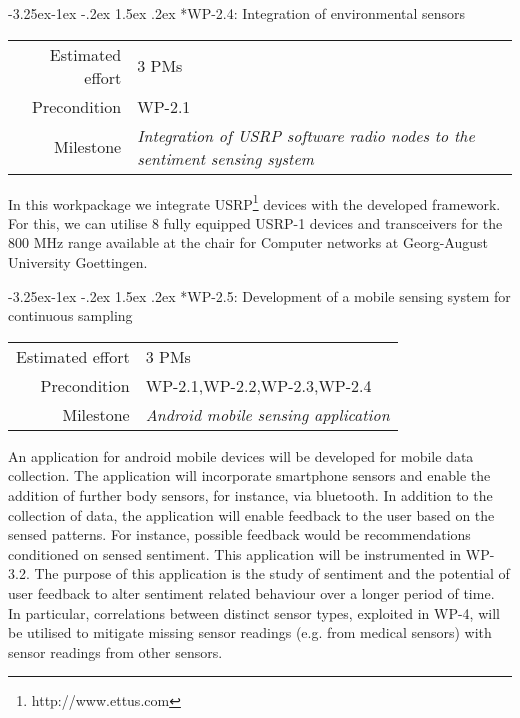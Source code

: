 \documentclass[12pt]{article}
\makeatletter
\newcommand{\kobyc}[1]{\begin{center}\fbox{\parbox{3in}{{\textcolor{green}{K: #1}}}}\end{center}}
\renewcommand\paragraph{\@startsection{paragraph}{4}{\z@}%
  {-3.25ex\@plus -1ex \@minus -.2ex}%
  {1.5ex \@plus .2ex}%
  {\normalfont\normalsize\bfseries}}
\makeatother
\begin{document}

\paragraph*{WP-2.4: Integration of environmental sensors}
\begin{tabular}{rl}
 Estimated effort& 3 PMs\\
 Precondition & WP-2.1\\
 Milestone & \begin{minipage}[t]{12.2cm}
\textit{Integration of USRP software radio nodes to the sentiment sensing system}\vspace{.2cm}
             \end{minipage}
\end{tabular}

\noindent
In this workpackage we integrate USRP\footnote{http://www.ettus.com} devices with the developed framework. 
For this, we can utilise 8 fully equipped USRP-1 devices and transceivers for the 800 MHz range available at the chair for Computer networks at Georg-August University Goettingen.


\paragraph*{WP-2.5: Development of a mobile sensing system for continuous sampling}
\begin{tabular}{rl}
 Estimated effort& 3 PMs\\
 Precondition & WP-2.1,WP-2.2,WP-2.3,WP-2.4\\
 Milestone & \begin{minipage}[t]{12.2cm}
\textit{Android mobile sensing application}\vspace{.2cm}
             \end{minipage}
\end{tabular}

\noindent
An application for android mobile devices will be developed for mobile data collection. 
The application will incorporate smartphone sensors and enable the addition of further body sensors, for instance, via bluetooth.
In addition to the collection of data, the application will enable feedback to the user based on the sensed patterns. 
For instance, possible feedback would be recommendations conditioned on sensed sentiment.  
This application will be instrumented in WP-3.2.
The purpose of this application is the study of sentiment and the potential of user feedback to alter sentiment related behaviour over a longer period of time. 
In particular, correlations between distinct sensor types, exploited in WP-4, will be utilised to mitigate missing sensor readings (e.g. from medical sensors) with sensor readings from other sensors.  
\end{document}
